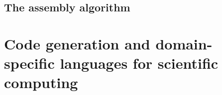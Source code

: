 \documentclass[thesis]{subfiles}
\begin{document}
\subsection{The assembly algorithm}




\section{Code generation and domain-specific languages for scientific computing}


\end{document}
